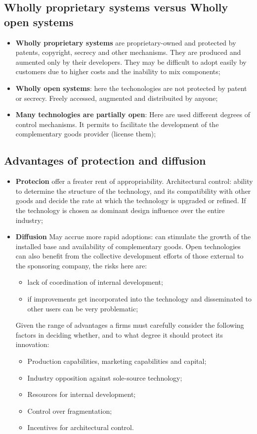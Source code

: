 \documentclass[12pt]{article}
\begin{document}
\subsection{Wholly proprietary systems versus Wholly open systems}
\begin{itemize}
    \item \textbf{Wholly proprietary systems} are proprietary-owned and protected by patents, copyright, secrecy and other mechanisms.
    They are produced and aumented only by their developers. They may be difficult to adopt easily by customers due to higher costs and the inability to mix components;
    \item \textbf{Wholly open systems}: here the techonologies are not protected by patent or secrecy. Freely accessed, augmented and distribuited by anyone;
    \item \textbf{Many technologies are partially open}: Here are used different degrees of control mechanisms. It permits to facilitate the development of the complementary goods provider (license them);
\end{itemize}

\subsection{Advantages of protection and diffusion}
\begin{itemize}
    \item \textbf{Protecion} offer a freater rent of appropriability. Architectural control: ability to determine the structure of the technology, and its compatibility with other goods and decide the rate at which the technology is upgraded or refined.
    If the technology is chosen as dominant design influence over the entire industry;
    \item \textbf{Diffusion} May accrue more rapid adoptions: can stimulate the growth of the installed base and availability of complementary goods.
    Open technologies can also benefit from the collective development efforts of those external to the sponsoring company, the risks here are:
    \begin{itemize}
        \item lack of coordination of internal development;
        \item if improvements get incorporated into the technology and disseminated to other users can be very problematic;
    \end{itemize}
    Given the range of advantages a firms must carefully consider the following factors in deciding whether, and to what degree it should protect its innovation:
    \begin{itemize}
        \item Production capabilities, marketing capabilities and capital;
        \item Industry opposition against sole-source technology;
        \item Resources for internal development;
        \item Control over fragmentation;
        \item Incentives for architectural control.
    \end{itemize}
\end{itemize}
\end{document}

